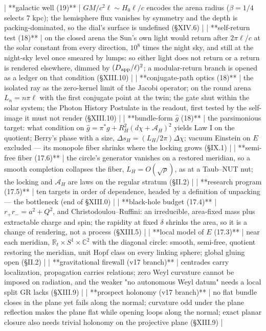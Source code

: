 | **galactic well (19)** | $GM/c^2\ell\sim H_0\ell/c$ encodes the arena radius ($\beta = 1/4$ selects 7 kpc); the hemisphere flux vanishes by symmetry and the depth is packing-dominated, so the dial's surface is undefined (§XIV.6) |
| **self-return test (18)** | on the closed arena the Sun's own light would return after $2\pi\ell/c$ at the solar constant from every direction, $10^8$ times the night sky, and still at the night-sky level once smeared by lumps: so either light does not return or a return is rendered elsewhere, dimmed by $(D_{\rm app}/\ell)^2$; a modular-return branch is opened as a ledger on that condition (§XIII.10) |
| **conjugate-path optics (18)** | the isolated ray as the zero-kernel limit of the Jacobi operator; on the round arena $L_n = n\pi\ell$ with the first conjugate point at the twin; the gate shut within the solar system; the Photon History Postulate in the readout, first tested by the self-image it must not render (§XIII.10) |
| **bundle-form $\hat g$ (18)** | the parsimonious target: what condition on $\hat g = \pi^*g+R_H^2(d\chi+\mathcal A_H)^2$ yields Law I on the quotient; Berry's phase with a size, $\Delta s_H = (L_H/2\pi)\Delta\chi$; vacuum Einstein on $E$ excluded — its monopole fiber shrinks where the locking grows (§IX.1) |
| **semi-free fiber (17.6)** | the circle's generator vanishes on a restored meridian, so a smooth completion collapses the fiber, $L_H = O(\sqrt\rho)$, as at a Taub–NUT nut; the locking and $\mathcal A_H$ are laws on the regular stratum (§II.2) |
| **research program (17.5)** | ten targets in order of dependence, headed by a definition of unpacking — the bottleneck (end of §XIII.0) |
| **black-hole budget (17.4)** | $r_+r_- = a^2+Q^2$, and Christodoulou–Ruffini: an irreducible, area-fixed mass plus extractable charge and spin; the rapidity at fixed $\delta$ shrinks the area, so it is a change of rendering, not a process (§XIII.5) |
| **local model of $E$ (17.3)** | near each meridian, $\mathbb R_t\times S^1\times\mathbb C^2$ with the diagonal circle: smooth, semi-free, quotient restoring the meridian, unit Hopf class on every linking sphere; global gluing open (§II.2) |
| **gravitational firewall (v17 branch)** | centrades carry localization, propagation carries relations; zero Weyl curvature cannot be imposed on radiation, and the weaker "no autonomous Weyl datum" needs a local split GR lacks (§XIII.9) |
| **prospect holonomy (v17 branch)** | no flat bundle closes in the plane yet fails along the normal; curvature odd under the plane reflection makes the plane flat while opening loops along the normal; exact planar closure also needs trivial holonomy on the projective plane (§XIII.9) |
